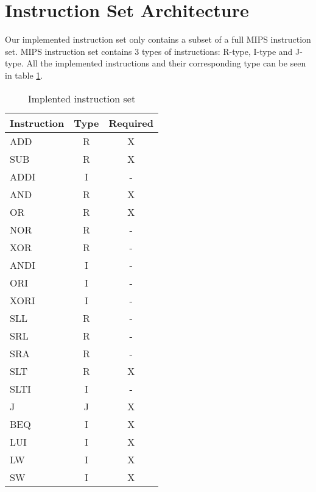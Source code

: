 \section{Instruction Set Architecture}

Our implemented instruction set only contains a subset of a full MIPS instruction set.
MIPS instruction set contains 3 types of instructions: R-type, I-type and J-type.
All the implemented instructions and their corresponding type can be seen in table \ref{table:instruction-types}.

\begin{table}
  \centering
    \begin{tabular}{l|c|c}
    Instruction & Type & Required \\ \hline
    ADD         & R    & X        \\
    SUB         & R    & X        \\
    ADDI        & I    & -        \\
    AND         & R    & X        \\
    OR          & R    & X        \\
    NOR         & R    & -        \\
    XOR         & R    & -        \\
    ANDI        & I    & -        \\
    ORI         & I    & -        \\
    XORI        & I    & -        \\
    SLL         & R    & -        \\
    SRL         & R    & -        \\
    SRA         & R    & -        \\
    SLT         & R    & X        \\
    SLTI        & I    & -        \\
    J           & J    & X        \\
    BEQ         & I    & X        \\
    LUI         & I    & X        \\
    LW          & I    & X        \\
    SW          & I    & X        \\
    \end{tabular}
    \caption {Implented instruction set}
    \label{table:instruction-types}
\end{table}
